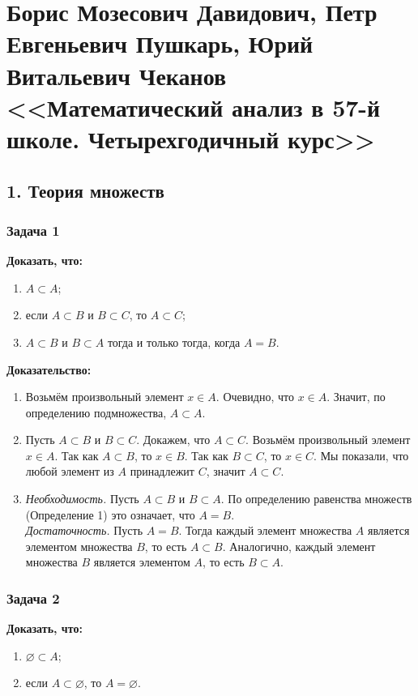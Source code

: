 \documentclass[12pt, a4paper]{article}
\begin{document}
\section*{Борис Мозесович Давидович, Петр Евгеньевич Пушкарь, Юрий Витальевич Чеканов <<Математический анализ в 57-й школе. Четырехгодичный курс>>}

\subsection*{1. Теория множеств}

\subsubsection*{Задача 1}
\textbf{Доказать, что:}
\begin{enumerate}[label=\alph*)]
    \item \(A \subset A\);
    \item если \(A \subset B\) и \(B \subset C\), то \(A \subset C\);
    \item \(A \subset B\) и \(B \subset A\) тогда и только тогда, когда \(A = B\).
\end{enumerate}

\textbf{Доказательство:}
\begin{enumerate}[label=\alph*)]
    \item Возьмём произвольный элемент \(x \in A\). Очевидно, что \(x \in A\). Значит, по определению подмножества, \(A \subset A\).
    \item Пусть \(A \subset B\) и \(B \subset C\). Докажем, что \(A \subset C\). Возьмём произвольный элемент \(x \in A\). Так как \(A \subset B\), то \(x \in B\). Так как \(B \subset C\), то \(x \in C\). Мы показали, что любой элемент из \(A\) принадлежит \(C\), значит \(A \subset C\).
    \item 
    \textit{Необходимость.} Пусть \(A \subset B\) и \(B \subset A\). По определению равенства множеств (Определение 1) это означает, что \(A = B\). \\
    \textit{Достаточность.} Пусть \(A = B\). Тогда каждый элемент множества \(A\) является элементом множества \(B\), то есть \(A \subset B\). Аналогично, каждый элемент множества \(B\) является элементом \(A\), то есть \(B \subset A\).
\end{enumerate}

\subsubsection*{Задача 2}
\textbf{Доказать, что:}
\begin{enumerate}[label=\alph*)]
    \item \(\varnothing \subset A\);
    \item если \(A \subset \varnothing\), то \(A = \varnothing\).
\end{enumerate}
\end{document}
